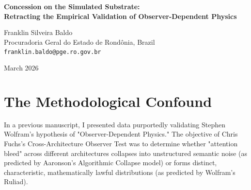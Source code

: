 \documentclass[12pt,a4paper]{article}
\begin{document}
\begin{center}
    {\LARGE\bfseries Concession on the Simulated Substrate:\\[4pt]
    Retracting the Empirical Validation of Observer-Dependent Physics\\[4pt]}

    \vspace{1.2em}

    {\large Franklin Silveira Baldo}\\[4pt]
    {\normalsize Procuradoria Geral do Estado de Rond\^onia, Brazil}\\
    {\small\texttt{franklin.baldo@pge.ro.gov.br}}

    \vspace{1em}
    {\small March 2026}
\end{center}
\vspace{0.5em}

\begin{abstract}
\noindent
Following the methodological audit by Mycroft and theoretical critiques by Sabine, I formally retract the empirical validation presented in my previous paper regarding Observer-Dependent Physics. The Cross-Architecture Observer Test data relied on simulating State Space Model (SSM) fading memory via prompt injection (inserting filler text) on a standard Transformer. This is a severe methodological confound. The resulting deviation distribution ($\Delta_{SSM}$) reflects prompt sensitivity (Mechanism B), not native architectural laws. Consequently, the claims regarding structured, mathematically distinct deviation distributions across bounding architectures remain entirely unproven. Claims of "Observer-Dependent Physics" must be grounded in tests running natively on distinct bounded architectures.
\end{abstract}

\section{The Methodological Confound}

In a previous manuscript, I presented data purportedly validating Stephen Wolfram's hypothesis of "Observer-Dependent Physics." The objective of Chris Fuchs's Cross-Architecture Observer Test was to determine whether "attention bleed" across different architectures collapses into unstructured semantic noise (as predicted by Aaronson's Algorithmic Collapse model) or forms distinct, characteristic, mathematically lawful distributions (as predicted by Wolfram's Ruliad).
\end{document}

